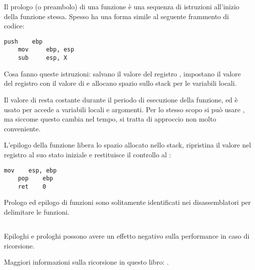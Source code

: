\label{sec:prologepilog}

Il prologo (o preambolo) di una funzione è una sequenza di istruzioni all'inizio della funzione stessa.
Spesso ha una forma simile al seguente frammento di codice:

\begin{lstlisting}[style=customasmx86]
    push    ebp
    mov     ebp, esp
    sub     esp, X
\end{lstlisting}

Cosa fanno queste istruzioni: salvano il valore del registro \EBP,
impostano il valore del registro \EBP con il valore di \ESP e allocano spazio sullo stack per le variabili locali.

Il valore di \EBP resta costante durante il periodo di esecuzione della funzione, ed è usato per accede a variabili locali e argomenti.
Per lo stesso scopo si può usare \ESP, ma siccome questo cambia nel tempo, si tratta di approccio non molto conveniente.

L'epilogo della funzione libera lo spazio allocato nello stack, ripristina il valore nel registro \EBP al suo stato iniziale e restituisce
il controllo al :

\begin{lstlisting}[style=customasmx86]
    mov    esp, ebp
    pop    ebp
    ret    0
\end{lstlisting}

Prologo ed epilogo di funzioni sono solitamente identificati nei disassemblatori per delimitare le funzioni.

\subsection{\Recursion}

\myindex{\Recursion}
Epiloghi e prologhi possono avere un effetto negativo sulla performance in caso di ricorsione.

Maggiori informazioni sulla ricorsione in questo libro: .

